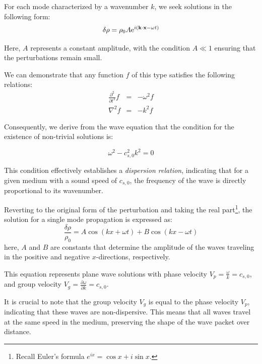 For each mode characterized by a wavenumber \( k \), we seek solutions in the following form:
%
\begin{equation}
\delta \rho = \rho_0 A {\rm e}^{i(\vb k \cdot \vb x - \omega t)}
\end{equation}

Here, \( A \) represents a constant amplitude, with the condition \( A \ll 1 \) ensuring that the perturbations remain small.

We can demonstrate that any function \( f \) of this type satisfies the following relations:
%
\begin{eqnarray}
\frac{\partial^2}{\partial t^2} f & = & - \omega^2 f \\
\nabla^2 f & = & -k^2 f
\end{eqnarray}

Consequently, we derive from the wave equation that the condition for the existence of non-trivial solutions is:
%
\begin{remark}
\begin{equation}
\omega^2 - c_{s,0}^2 k^2 = 0
\end{equation}
\end{remark}

This condition effectively establishes a \emph{dispersion relation}, indicating that for a given medium with a sound speed of \( c_{s,0} \), the frequency of the wave is directly proportional to its wavenumber. 

Reverting to the original form of the perturbation and taking the real part\footnote{Recall Euler's formula \( e^{ix} = \cos x + i \sin x \).}, the solution for a single mode propagation is expressed as:
%
\begin{equation}
\frac{\delta \rho}{\rho_0} = A \cos(kx + \omega t) + B \cos(kx - \omega t) 
\end{equation}
%
here, \( A \) and \( B \) are constants that determine the amplitude of the waves traveling in the positive and negative \( x \)-directions, respectively.

This equation represents plane wave solutions with phase velocity \( V_p = \frac{\omega}{k} = c_{s,0} \), and group velocity \( V_g = \frac{\partial \omega}{\partial k} = c_{s,0} \).

It is crucial to note that the group velocity \( V_g \) is equal to the phase velocity \( V_p \), indicating that these waves are non-dispersive. This means that all waves travel at the same speed in the medium, preserving the shape of the wave packet over distance.

